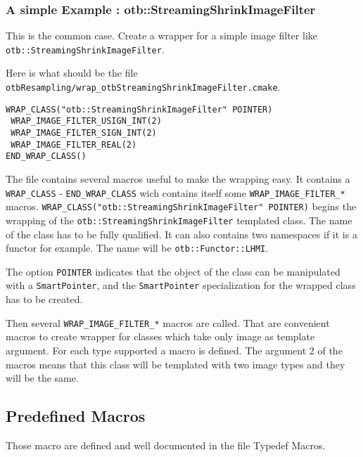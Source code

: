 \subsubsection{A simple Example : otb::StreamingShrinkImageFilter}
This is the common case. Create a wrapper for a 
simple image filter like 
\verb$otb::StreamingShrinkImageFilter$. 

Here is what should be the file 
\verb$otbResampling/wrap_otbStreamingShrinkImageFilter.cmake$.

\small
\begin{verbatim}
WRAP_CLASS("otb::StreamingShrinkImageFilter" POINTER)
 WRAP_IMAGE_FILTER_USIGN_INT(2)
 WRAP_IMAGE_FILTER_SIGN_INT(2)
 WRAP_IMAGE_FILTER_REAL(2)
END_WRAP_CLASS()
\end{verbatim}
\normalsize

The file contains several macros useful to make the wrapping easy. It contains 
a \verb$WRAP_CLASS$ - \verb$END_WRAP_CLASS$ wich contains itself some 
\verb$WRAP_IMAGE_FILTER_*$ macros. 
\verb$WRAP_CLASS("otb::StreamingShrinkImageFilter" POINTER)$ begins the wrapping of the 
\verb$otb::StreamingShrinkImageFilter$ templated class.
The name of the class has to be fully qualified.  It can also contains two namespaces if it is 
a functor for example. The name will be \verb$otb::Functor::LHMI$.

The option \verb$POINTER$ indicates that the object of the class can be manipulated with a 
\verb$SmartPointer$, and the  \verb$SmartPointer$ specialization for the wrapped class has to be created.

Then several \verb$WRAP_IMAGE_FILTER_*$ macros are called. That are convenient macros to create
wrapper for classes which take only image as template argument. For each type supported  
a macro is defined. The argument 2 of the macros means that this class will be templated with 
two image types and they will be the same.


\subsection{Predefined Macros}

Those macro are defined and well documented in the file Typedef Macros.

